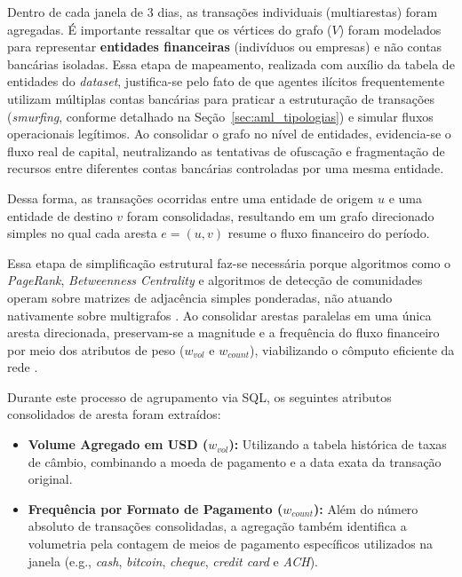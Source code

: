 \documentclass[a4paper,12pt,oneside,onecolumn,final,fleqn]{repUERJ}
\begin{document}
Dentro de cada janela de 3 dias, as transações individuais (multiarestas) foram agregadas. É importante ressaltar que os vértices do grafo ($V$) foram modelados para representar \textbf{entidades financeiras} (indivíduos ou empresas) e não contas bancárias isoladas. Essa etapa de mapeamento, realizada com auxílio da tabela de entidades do \textit{dataset}, justifica-se pelo fato de que agentes ilícitos frequentemente utilizam múltiplas contas bancárias para praticar a estruturação de transações (\textit{smurfing}, conforme detalhado na Seção~\ref{sec:aml_tipologias}) e simular fluxos operacionais legítimos. Ao consolidar o grafo no nível de entidades, evidencia-se o fluxo real de capital, neutralizando as tentativas de ofuscação e fragmentação de recursos entre diferentes contas bancárias controladas por uma mesma entidade.

Dessa forma, as transações ocorridas entre uma entidade de origem $u$ e uma entidade de destino $v$ foram consolidadas, resultando em um grafo direcionado simples no qual cada aresta $e = (u, v)$ resume o fluxo financeiro do período.

Essa etapa de simplificação estrutural faz-se necessária porque algoritmos como o \textit{PageRank}, \textit{Betweenness Centrality} e algoritmos de detecção de comunidades operam sobre matrizes de adjacência simples ponderadas, não atuando nativamente sobre multigrafos \cite{baigabyl2025using}. Ao consolidar arestas paralelas em uma única aresta direcionada, preservam-se a magnitude e a frequência do fluxo financeiro por meio dos atributos de peso ($w_{vol}$ e $w_{count}$), viabilizando o cômputo eficiente da rede \cite{vilella2025weirdnodes}.

Durante este processo de agrupamento via SQL, os seguintes atributos consolidados de aresta foram extraídos:

\begin{itemize}
    \item \textbf{Volume Agregado em USD ($w_{vol}$):} Utilizando a tabela histórica de taxas de câmbio, combinando a moeda de pagamento e a data exata da transação original.
    \item \textbf{Frequência por Formato de Pagamento ($w_{count}$):} Além do número absoluto de transações consolidadas, a agregação também identifica a volumetria pela contagem de meios de pagamento específicos utilizados na janela (e.g., \textit{cash}, \textit{bitcoin}, \textit{cheque}, \textit{credit card} e \textit{ACH}). 
\end{itemize}
\end{document}
